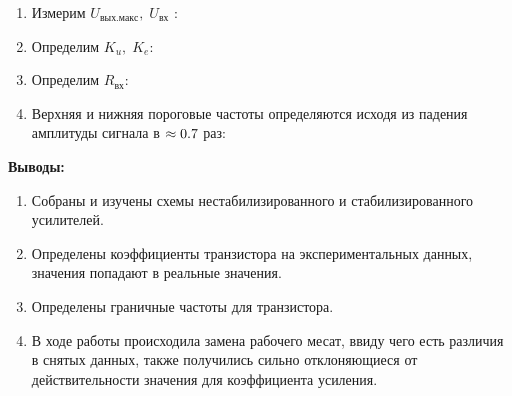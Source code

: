 \documentclass[a4paper]{article}
\begin{document}
\begin{enumerate}
        \begin{enumerate}
            \item Измерим $U_{вых. макс}, \; U_{вх}$ :

            \item Определим $K_u, \; K_e$:

            \item Определим $R_{вх}$:

            \item Верхняя и нижняя пороговые частоты определяются исходя из падения амплитуды сигнала в $\approx 0.7$ раз:
        \end{enumerate}


\end{enumerate}

\textbf{Выводы:}

\begin{enumerate}
    \item Собраны и изучены схемы нестабилизированного и стабилизированного усилителей.
    \item Определены коэффициенты транзистора на экспериментальных данных, значения попадают в реальные значения.
    \item Определены граничные частоты для транзистора.
    \item В ходе работы происходила замена рабочего месат, ввиду чего есть различия в снятых данных, также получились сильно отклоняющиеся от действительности значения для коэффициента усиления. 
\end{enumerate}
\end{document}
